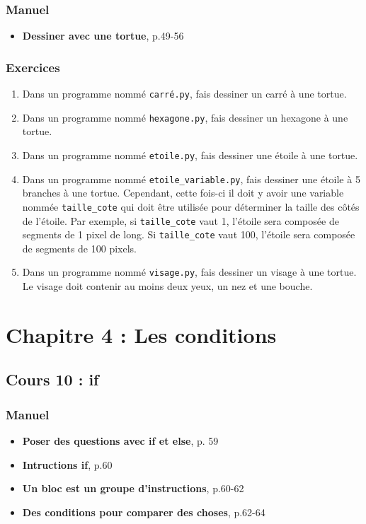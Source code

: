 \documentclass[11pt]{article}
\begin{document}
\subsubsection*{Manuel}
\label{sec:org7ff920c}
\begin{itemize}
\item \textbf{\og Dessiner avec une tortue\fg{}}, p.49-56
\end{itemize}
\subsubsection*{Exercices}
\label{sec:orgd9ea5a3}
\begin{enumerate}
\item Dans un programme nommé \texttt{carré.py}, fais dessiner un carré à une tortue.
\item Dans un programme nommé \texttt{hexagone.py}, fais dessiner un hexagone à une tortue.
\item Dans un programme nommé \texttt{etoile.py}, fais dessiner une étoile à une tortue.
\item Dans un programme nommé \texttt{etoile\_variable.py}, fais dessiner une étoile à 5 branches à une tortue. Cependant, cette fois-ci il doit y avoir une variable nommée \texttt{taille\_cote} qui doit être utilisée pour déterminer la taille des côtés de l'étoile. Par exemple, si \texttt{taille\_cote} vaut 1, l'étoile sera composée de segments de 1 pixel de long. Si \texttt{taille\_cote} vaut 100, l'étoile sera composée de segments de 100 pixels.
\item Dans un programme nommé \texttt{visage.py}, fais dessiner un visage à une tortue. Le visage doit contenir au moins deux yeux, un nez et une bouche.
\end{enumerate}

\section*{Chapitre 4 : Les conditions}
\label{chapitre4}
\subsection*{Cours 10 : if}
\label{chapitre4_cours10}
\subsubsection*{Manuel}
\label{sec:org3def2bd}
\begin{itemize}
\item \textbf{\og Poser des questions avec if et else\fg{}}, p. 59
\item \textbf{\og Intructions if\fg{}}, p.60
\item \textbf{\og Un bloc est un groupe d'instructions\fg{}}, p.60-62
\item \textbf{\og Des conditions pour comparer des choses\fg{}}, p.62-64
\end{itemize}
\end{document}
